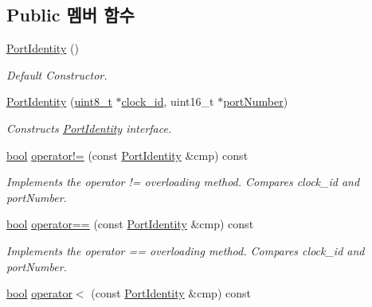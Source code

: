 \subsection*{Public 멤버 함수}
\begin{DoxyCompactItemize}
\item 
\hyperlink{class_port_identity_a055ca283831ed901692006019e6153e4}{Port\+Identity} ()
\begin{DoxyCompactList}\small\item\em Default Constructor. \end{DoxyCompactList}\item 
\hyperlink{class_port_identity_a39cb7d2b9ac0639b3e99dbe3c2ea91b2}{Port\+Identity} (\hyperlink{stdint_8h_aba7bc1797add20fe3efdf37ced1182c5}{uint8\+\_\+t} $\ast$\hyperlink{class_port_identity_a263e1028b568de892cf4a0b576693cbe}{clock\+\_\+id}, uint16\+\_\+t $\ast$\hyperlink{class_port_identity_ad323c105cae25089c0f53e4fec04c080}{port\+Number})
\begin{DoxyCompactList}\small\item\em Constructs \hyperlink{class_port_identity}{Port\+Identity} interface. \end{DoxyCompactList}\item 
\hyperlink{avb__gptp_8h_af6a258d8f3ee5206d682d799316314b1}{bool} \hyperlink{class_port_identity_ac459e52e4eafa1a42a5862920070db31}{operator!=} (const \hyperlink{class_port_identity}{Port\+Identity} \&cmp) const 
\begin{DoxyCompactList}\small\item\em Implements the operator \textquotesingle{}!=\textquotesingle{} overloading method. Compares clock\+\_\+id and port\+Number. \end{DoxyCompactList}\item 
\hyperlink{avb__gptp_8h_af6a258d8f3ee5206d682d799316314b1}{bool} \hyperlink{class_port_identity_aee25651fdfb4bddfab5e7f94df73b997}{operator==} (const \hyperlink{class_port_identity}{Port\+Identity} \&cmp) const 
\begin{DoxyCompactList}\small\item\em Implements the operator \textquotesingle{}==\textquotesingle{} overloading method. Compares clock\+\_\+id and port\+Number. \end{DoxyCompactList}\item 
\hyperlink{avb__gptp_8h_af6a258d8f3ee5206d682d799316314b1}{bool} \hyperlink{class_port_identity_ae4dd8c55a42c843c40fe134113cfa5b2}{operator$<$} (const \hyperlink{class_port_identity}{Port\+Identity} \&cmp) const 

\end{DoxyCompactItemize}
